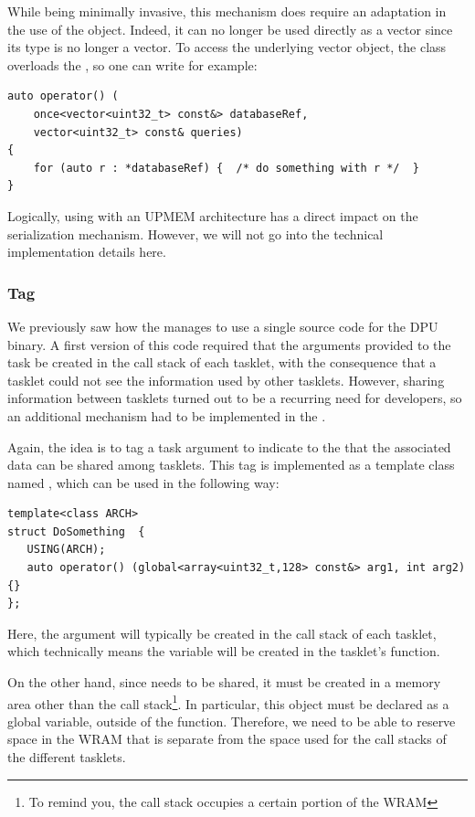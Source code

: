 While being minimally invasive, this mechanism does require an adaptation in the use of the  object.  Indeed, it can no longer be used directly as a vector since its type is no longer a vector.  To access the underlying vector object, the  class overloads the , so one can write for example: 

\begin{verbatim}
auto operator() (
    once<vector<uint32_t> const&> databaseRef, 
    vector<uint32_t> const& queries)  
{
    for (auto r : *databaseRef) {  /* do something with r */  }
}
\end{verbatim}

Logically, using  with an UPMEM architecture has a direct impact on the serialization mechanism.  However, we will not go into the technical implementation details here.

\subsubsection{Tag }

We previously saw how the \BPL manages to use a single source code for the DPU binary. A first version of this code required that the arguments provided to the task be created in the call stack of each tasklet, with the consequence that a tasklet could not see the information used by other tasklets. However, sharing information between tasklets turned out to be a recurring need for developers, so an additional mechanism had to be implemented in the \BPL.

Again, the idea is to tag a task argument to indicate to the \BPL that the associated data can be shared among tasklets. This tag is implemented as a template class named , which can be used in the following way:

\begin{verbatim}
template<class ARCH>
struct DoSomething  {
   USING(ARCH);
   auto operator() (global<array<uint32_t,128> const&> arg1, int arg2) {}
};
\end{verbatim}

Here, the argument  will typically be created in the call stack of each tasklet, which technically means the variable will be created in the tasklet's  function.

On the other hand, since  needs to be shared, it must be created in a memory area other than the  call stack\footnote{To remind you, the call stack occupies a certain portion of the WRAM}. In particular, this object must be declared as a global variable, outside of the  function. Therefore, we need to be able to reserve space in the WRAM that is separate from the space used for the call stacks of the different tasklets.

